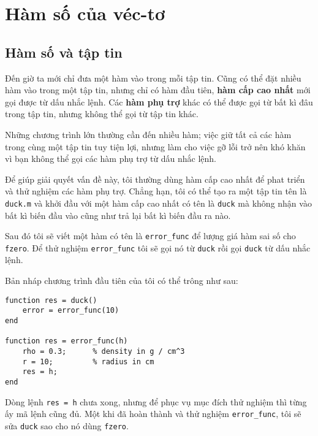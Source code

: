 \documentclass[12pt]{book}
\begin{document}










\chapter{Hàm số của véc-tơ}


\section{Hàm số và tập tin}
\label{funfiles}

Đến giờ ta mới chỉ đưa một hàm vào trong mỗi tập tin. Cũng có thể
đặt nhiều hàm vào trong một tập tin, nhưng chỉ có hàm đầu tiên,
{\bf hàm cấp cao nhất} mới gọi được từ dấu nhắc lệnh. Các 
{\bf hàm phụ trợ} khác có thể được gọi từ bất kì đâu trong tập tin,
nhưng không thể gọi từ tập tin khác.

Những chương trình lớn thường cần đến nhiều hàm; việc giữ tất cả
các hàm trong cùng một tập tin tuy tiện lợi, nhưng làm cho việc gỡ lỗi
trở nên khó khăn vì bạn không thể gọi các hàm phụ trợ từ dấu nhắc lệnh.

Để giúp giải quyết vấn đề này, tôi thường dùng hàm cấp cao nhất
để phat triển và thử nghiệm các hàm phụ trợ. Chẳng hạn, tôi có thể
tạo ra một tập tin tên là {\tt duck.m} và khởi đầu với một hàm cấp 
cao nhất có tên là {\tt duck} mà không nhận vào bất kì biến đầu vào
cũng như trả lại bất kì biến đầu ra nào.

Sau đó tôi sẽ viết một hàm có tên là \verb#error_func# để lượng giá
hàm sai số cho {\tt fzero}. Để thử nghiệm \verb#error_func# tôi sẽ
gọi nó từ  {\tt duck} rồi gọi {\tt duck} từ dấu nhắc lệnh.

Bản nháp chương trình đầu tiên của tôi có thể trông như sau:

\begin{verbatim}
function res = duck()
    error = error_func(10)
end

function res = error_func(h)
    rho = 0.3;      % density in g / cm^3
    r = 10;         % radius in cm
    res = h;
end
\end{verbatim}
%
Dòng lệnh {\tt res = h} chưa xong, nhưng để phục vụ mục đích thử nghiệm
thì từng ấy mã lệnh cũng đủ.
Một khi đã hoàn thành và thử nghiệm \verb#error_func#, tôi sẽ sửa
{\tt duck} sao cho nó dùng {\tt fzero}.
\end{document}
